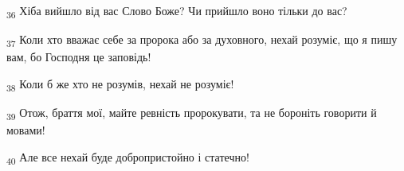 \begin{tcolorbox}
\textsubscript{36} Хіба вийшло від вас Слово Боже? Чи прийшло воно тільки до вас?
\end{tcolorbox}
\begin{tcolorbox}
\textsubscript{37} Коли хто вважає себе за пророка або за духовного, нехай розуміє, що я пишу вам, бо Господня це заповідь!
\end{tcolorbox}
\begin{tcolorbox}
\textsubscript{38} Коли б же хто не розумів, нехай не розуміє!
\end{tcolorbox}
\begin{tcolorbox}
\textsubscript{39} Отож, браття мої, майте ревність пророкувати, та не бороніть говорити й мовами!
\end{tcolorbox}
\begin{tcolorbox}
\textsubscript{40} Але все нехай буде добропристойно і статечно!
\end{tcolorbox}
